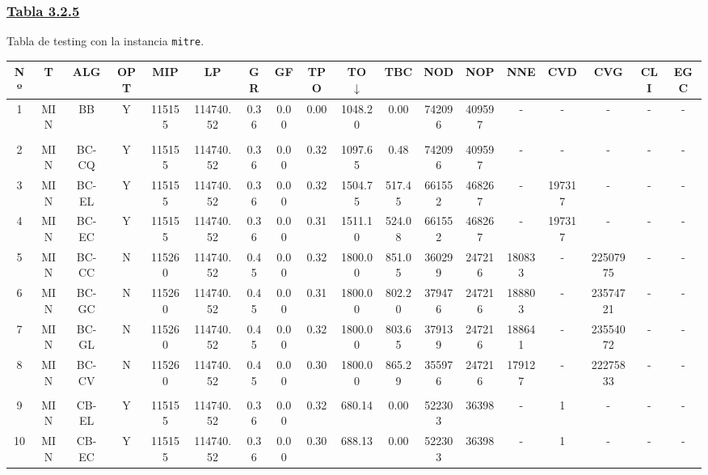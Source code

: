\subsubsection*{\underline{Tabla 3.2.5}}
\noindent Tabla de testing con la instancia \verb_mitre_.\\

{
\footnotesize\centering
\hspace*{-5mm}\begin{tabular}{ *{17}{c|} c }
\hline
\textbf{Nº} & \textbf{T} & \textbf{ALG} & \textbf{OPT} & \textbf{MIP} & \textbf{LP} & \textbf{GR} & \textbf{GF} & \textbf{TPO} & \textbf{TO} $\downarrow$ & \textbf{TBC} & \textbf{NOD} & \textbf{NOP} & \textbf{NNE} & \textbf{CVD} & \textbf{CVG} & \textbf{CLI} & \textbf{EGC}\\
\hline
1 & MIN & BB & Y & 115155 & 114740.52 & 0.36 & 0.00 & 0.00 & 1048.20 & 0.00 & 742096 & 409597 & - & - & - & - & -\\
\hline
\multicolumn{18}{c}{}
\\
\hline
2 & MIN & BC-CQ & Y & 115155 & 114740.52 & 0.36 & 0.00 & 0.32 & 1097.65 & 0.48 & 742096 & 409597 & - & - & - & - & -\\
\hline
3 & MIN & BC-EL & Y & 115155 & 114740.52 & 0.36 & 0.00 & 0.32 & 1504.75 & 517.45 & 661552 & 468267 & - & 197317 & - & - & -\\
\hline
4 & MIN & BC-EC & Y & 115155 & 114740.52 & 0.36 & 0.00 & 0.31 & 1511.10 & 524.08 & 661552 & 468267 & - & 197317 & - & - & -\\
\hline
5 & MIN & BC-CC & N & 115260 & 114740.52 & 0.45 & 0.00 & 0.32 & 1800.00 & 851.05 & 360299 & 247216 & 180833 & - & 22507975 & - & -\\
\hline
6 & MIN & BC-GC & N & 115260 & 114740.52 & 0.45 & 0.00 & 0.31 & 1800.00 & 802.20 & 379476 & 247216 & 188803 & - & 23574721 & - & -\\
\hline
7 & MIN & BC-GL & N & 115260 & 114740.52 & 0.45 & 0.00 & 0.32 & 1800.00 & 803.65 & 379139 & 247216 & 188641 & - & 23554072 & - & -\\
\hline
8 & MIN & BC-CV & N & 115260 & 114740.52 & 0.45 & 0.00 & 0.30 & 1800.00 & 865.29 & 355976 & 247216 & 179127 & - & 22275833 & - & -\\
\hline
\multicolumn{18}{c}{}
\\
\hline
9 & MIN & CB-EL & Y & 115155 & 114740.52 & 0.36 & 0.00 & 0.32 & 680.14 & 0.00 & 522303 & 36398 & - & 1 & - & - & -\\
\hline
10 & MIN & CB-EC & Y & 115155 & 114740.52 & 0.36 & 0.00 & 0.30 & 688.13 & 0.00 & 522303 & 36398 & - & 1 & - & - & -\\

\end{tabular}}
